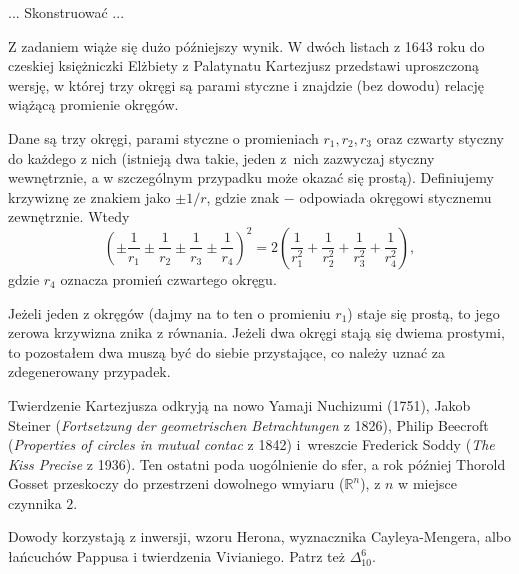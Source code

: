 %

\begin{problem}
    \label{problem_apolloniusza}%
    ...
    Skonstruować ...
\end{problem}

Z zadaniem wiąże się dużo późniejszy wynik.
W dwóch listach z 1643 roku do czeskiej księżniczki Elżbiety z Palatynatu Kartezjusz przedstawi uproszczoną wersję, w której trzy okręgi są parami styczne i znajdzie (bez dowodu) relację wiążącą promienie okręgów.

\begin{theorem}[Kartezjusza]
    Dane są trzy okręgi, parami styczne o promieniach $r_1, r_2, r_3$ oraz czwarty styczny do każdego z nich (istnieją dwa takie, jeden z~nich zazwyczaj styczny wewnętrznie, a w szczególnym przypadku może okazać się prostą).
    Definiujemy krzywiznę ze znakiem jako $\pm 1 / r$, gdzie znak $-$ odpowiada okręgowi stycznemu zewnętrznie.
    Wtedy
    \begin{equation}
        \left(\pm \frac{1}{r_1} \pm  \frac{1}{r_2} \pm  \frac{1}{r_3} \pm  \frac{1}{r_4}\right)^2 = 2 \left(\frac{1}{r_1^2} + \frac{1}{r_2^2} + \frac{1}{r_3^2} + \frac{1}{r_4^2}\right),
    \end{equation}
    gdzie $r_4$ oznacza promień czwartego okręgu.
\end{theorem}

Jeżeli jeden z okręgów (dajmy na to ten o promieniu $r_1$) staje się prostą, to jego zerowa krzywizna znika z równania.
Jeżeli dwa okręgi stają się dwiema prostymi, to pozostałem dwa muszą być do siebie przystające, co należy uznać za zdegenerowany przypadek.

Twierdzenie Kartezjusza odkryją na nowo Yamaji Nuchizumi (1751), Jakob Steiner (\emph{Fortsetzung der geometrischen Betrachtungen} z 1826), Philip Beecroft (\emph{Properties of circles in mutual contac} z 1842) i~wreszcie Frederick Soddy (\emph{The Kiss Precise} z 1936).
%
%
%
%
Ten ostatni poda uogólnienie do sfer, a rok później Thorold Gosset przeskoczy do przestrzeni dowolnego wmyiaru ($\mathbb R^n$), z $n$ w miejsce czynnika $2$.
%

Dowody korzystają z inwersji, wzoru Herona, wyznacznika Cayleya-Mengera, albo łańcuchów Pappusa i twierdzenia Vivianiego.
Patrz też $\Delta_{10}^6$. %


